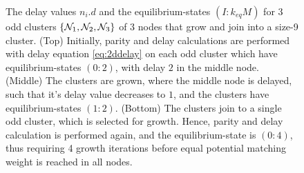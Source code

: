 \begin{figure}[p]
\begin{tikzpicture}[on grid, scale=1]
    \end{tikzpicture}
    \caption{The delay values $n_i.d$ and the equilibrium-states $(I:k_{eq}M)$ for 3 odd clusters $\{\nset_1, \nset_2, \nset_3\}$ of 3 nodes that grow and join into a size-9 cluster. (Top) Initially, parity and delay calculations  are performed with delay equation \eqref{eq:2ddelay} on each odd cluster which have equilibrium-states $(0:2)$, with delay $2$ in the middle node. (Middle) The clusters are grown, where the middle node is delayed, such that it's delay value decreases to $1$, and the clusters have equilibrium-states $(1:2)$. (Bottom) The clusters join to a single odd cluster, which is selected for growth. Hence, parity and delay calculation is performed again, and the equilibrium-state is $(0:4)$, thus requiring 4 growth iterations before equal potential matching weight is reached in all nodes.}\label{fig:kbloom}
\end{figure}

